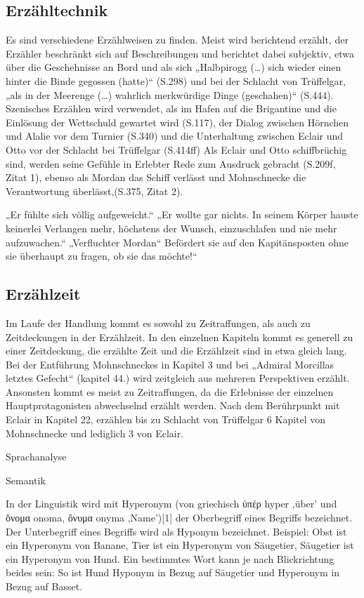 \subsection{Erzähltechnik}

Es sind verschiedene Erzählweisen zu finden. Meist wird berichtend erzählt, der Erzähler beschränkt sich auf Beschreibungen und berichtet dabei  subjektiv, etwa über die Geschehnisse an Bord und als sich „Halbpirogg (…) sich wieder einen hinter die Binde gegossen (hatte)“ (S.298) und bei der Schlacht von Trüffelgar, „als in der Meerenge (…) wahrlich merkwürdige Dinge (geschahen)“ (S.444). Szenisches Erzählen wird verwendet, als im Hafen auf die Brigantine und die Einlösung der Wettschuld gewartet wird (S.117), der Dialog zwischen Hörnchen und Alalie vor dem Turnier (S.340) und die Unterhaltung zwischen Eclair und Otto vor der Schlacht bei Trüffelgar (S.414ff) Als Eclair und Otto schiffbrüchig sind, werden seine Gefühle in Erlebter Rede zum Ausdruck gebracht (S.209f, Zitat 1), ebenso als Mordan das Schiff verlässt und Mohnschnecke die Verantwortung überlässt,(S.375, Zitat 2).


„Er fühlte sich völlig aufgeweicht.“ „Er wollte gar nichts. In seinem Körper hauste keinerlei Verlangen mehr, höchstens der Wunsch, einzuschlafen und nie mehr aufzuwachen.“
„Verfluchter Mordan“ Befördert sie auf den Kapitänsposten ohne sie überhaupt zu fragen, ob sie das möchte!“

\subsection{Erzählzeit}

Im Laufe der Handlung kommt es sowohl zu Zeitraffungen, als auch zu Zeitdeckungen in der Erzählzeit. In den einzelnen Kapiteln kommt es generell zu einer Zeitdeckung, die erzählte Zeit und die Erzählzeit sind in etwa gleich lang. Bei der Entführung Mohnschneckes in Kapitel 3 und bei „Admiral Morcillas letztes Gefecht“ (kapitel 44.) wird zeitgleich aus mehreren Perspektiven erzählt. Ansonsten kommt es meist zu Zeitraffungen, da die Erlebnisse der einzelnen Hauptprotagonisten abwechselnd erzählt werden.  Nach dem Berührpunkt mit Eclair in Kapitel 22, erzählen bis zu Schlacht von Trüffelgar 6 Kapitel von Mohnschnecke und lediglich 3 von Eclair.

Sprachanalyse
 
Semantik


In der Linguistik wird mit Hyperonym (von griechisch ὑπέρ hyper ‚über’ und ὄνομα onoma, ὄνυμα onyma ‚Name’)[1] der Oberbegriff eines Begriffs bezeichnet. Der Unterbegriff eines Begriffs wird als Hyponym bezeichnet.
Beispiel: Obst ist ein Hyperonym von Banane, Tier ist ein Hyperonym von Säugetier, Säugetier ist ein Hyperonym von Hund.
Ein bestimmtes Wort kann je nach Blickrichtung beides sein: So ist Hund Hyponym in Bezug auf Säugetier und Hyperonym in Bezug auf Basset.


